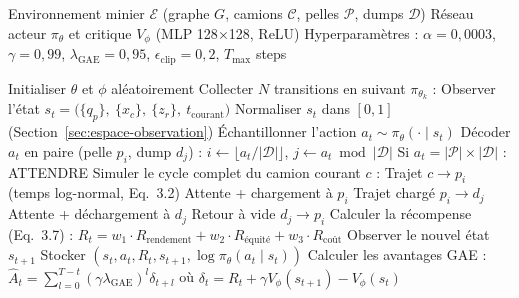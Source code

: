 \documentclass[11pt,a4paper]{report}
\begin{document}
\begin{algorithm}[H]
\caption{PPO pour le dispatching minier camion-pelle-dump}
\label{alg:ppo-dispatching}
\begin{algorithmic}[1]

\REQUIRE Environnement minier $\mathcal{E}$ (graphe $G$, camions $\mathcal{C}$, pelles $\mathcal{P}$, dumps $\mathcal{D}$)
\REQUIRE Réseau acteur $\pi_\theta$ et critique $V_\phi$ (MLP 128$\times$128, ReLU)
\REQUIRE Hyperparamètres : $\alpha = 0{,}0003$, $\gamma = 0{,}99$, $\lambda_{\text{GAE}} = 0{,}95$, $\epsilon_{\text{clip}} = 0{,}2$, $T_{\max}$ steps

\STATE Initialiser $\theta$ et $\phi$ aléatoirement
    \STATE Collecter $N$ transitions en suivant $\pi_{\theta_k}$ :
        \STATE Observer l'état $s_t = \big(\{q_p\},\ \{x_c\},\ \{z_r\},\ t_{\text{courant}}\big)$
        \STATE Normaliser $s_t$ dans $[0, 1]$ (Section~\ref{sec:espace-observation})
        \STATE Échantillonner l'action $a_t \sim \pi_\theta(\cdot \mid s_t)$
        \STATE Décoder $a_t$ en paire (pelle $p_i$, dump $d_j$) :
        \STATE \hspace{1em} $i \leftarrow \lfloor a_t / |\mathcal{D}| \rfloor$, \quad $j \leftarrow a_t \bmod |\mathcal{D}|$
        \STATE \hspace{1em} Si $a_t = |\mathcal{P}| \times |\mathcal{D}|$ : ATTENDRE
        \STATE Simuler le cycle complet du camion courant $c$ :
        \STATE \hspace{1em} Trajet $c \to p_i$ (temps log-normal, Eq.~3.2)
        \STATE \hspace{1em} Attente + chargement à $p_i$
        \STATE \hspace{1em} Trajet chargé $p_i \to d_j$
        \STATE \hspace{1em} Attente + déchargement à $d_j$
        \STATE \hspace{1em} Retour à vide $d_j \to p_i$
        \STATE Calculer la récompense (Eq.~3.7) :
        \STATE \hspace{1em} $R_t = w_1 \cdot R_{\text{rendement}} + w_2 \cdot R_{\text{équité}} + w_3 \cdot R_{\text{coût}}$
        \STATE Observer le nouvel état $s_{t+1}$
        \STATE Stocker $(s_t, a_t, R_t, s_{t+1}, \log \pi_\theta(a_t \mid s_t))$
    \ENDFOR
    \STATE Calculer les avantages GAE : $\hat{A}_t = \sum_{l=0}^{T-t} (\gamma \lambda_{\text{GAE}})^l \delta_{t+l}$
    \STATE \hspace{1em} où $\delta_t = R_t + \gamma V_\phi(s_{t+1}) - V_\phi(s_t)$

\end{algorithmic}
\end{algorithm}
\end{document}
